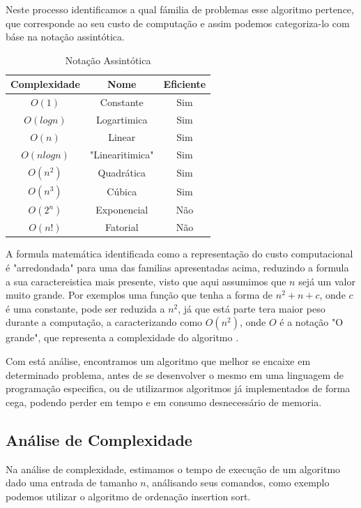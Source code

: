 \documentclass[
	12pt,				%
	openright,			%
	oneside,			%
	a4paper,			%
	english,			%
	brazil				%
	]{abntex2}
\begin{document}
Neste processo identificamos a qual fámilia de problemas esse algoritmo pertence, que corresponde ao seu custo de
computação \cite{introductionAlgorthms} e assim podemos categoriza-lo com báse na notação assintótica.

\begin{table}[htb]
	\centering
	\caption{\label{Notação Assintótica}Notação Assintótica}
	\begin{tabular}{|c|c|c|}
	\hline
		Complexidade & Nome & Eficiente \\ \hline
		$O(1)$ & Constante & Sim \\ \hline
		$O(log n)$ & Logartimica & Sim \\ \hline
		$O(n)$ & Linear & Sim \\ \hline
		$O(n log n)$ & "Linearitimica" & Sim \\ \hline
		$O(n^2)$ & Quadrática & Sim \\ \hline
		$O(n^3)$ & Cúbica & Sim \\ \hline
		$O(2^n)$ & Exponencial & Não \\ \hline
		$O(n!)$ & Fatorial & Não \\ \hline
	\end{tabular}
\end{table}

A formula matemática identificada como a representação do custo computacional é "arredondada" para uma das familias
apresentadas acima, reduzindo a formula a sua caractereistica mais presente, visto que aqui assumimos que $n$ sejá
um valor muito grande. Por exemplos uma função que tenha a forma de $n^2 + n + c$, onde $c$ é uma constante, 
pode ser reduzida a $n^2$, já que está parte tera maior peso durante a computação, a caracterizando 
como $O(n^2)$, onde $O$ é a notação "O grande", que representa a complexidade do algoritmo \cite{introductionAlgorthms}.

Com está análise, encontramos um algoritmo que melhor se encaixe em determinado problema, antes de se
desenvolver o mesmo em uma linguagem de programação especifica, ou de utilizarmos algoritmos já implementados de forma
cega, podendo perder em tempo e em consumo desnecessário de memoria.

\subsection{Análise de Complexidade}

Na análise de complexidade, estimamos o tempo de execução de um algoritmo dado uma entrada de tamanho $n$, análisando 
seus comandos, como exemplo podemos utilizar o algoritmo de ordenação insertion sort. 
\end{document}
